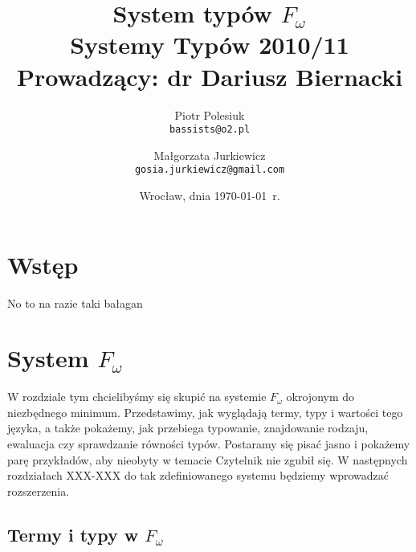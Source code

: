 \documentclass[11pt,leqno]{article}
\title{{\textbf{System typów $F_{\omega}$}}\\[1ex]
       {\Large Systemy Typów 2010/11}\\[-1ex]
       {\large Prowadzący: dr Dariusz Biernacki}}
\author{Piotr Polesiuk \\ \texttt{bassists@o2.pl} 
   \and Małgorzata Jurkiewicz \\ \texttt{gosia.jurkiewicz@gmail.com}}
\date{Wrocław, dnia \today\ r.}
\begin{document}
\thispagestyle{empty}
\maketitle

\pagebreak

\theoremstyle{plain}
\newtheorem{twierdzenie}{Twierdzenie}
\newtheorem{lemay}{Lemat}

\theoremstyle{definition}
\newtheorem{definicja}{Definicja}

\section{Wstęp}
\setcounter{equation}{0}


No to na razie taki bałagan



\section{System $F_{\omega}$}                                 
\setcounter{equation}{0}

W rozdziale tym chcielibyśmy się skupić na systemie $F_{\omega}$ okrojonym do niezbędnego minimum.
Przedstawimy, jak wyglądają termy, typy i wartości tego języka, a także pokażemy, jak przebiega typowanie,
znajdowanie rodzaju, ewaluacja czy sprawdzanie równości typów. Postaramy się pisać jasno i pokażemy parę przykładów, 
aby nieobyty w temacie Czytelnik nie zgubił się.  W następnych rozdziałach XXX-XXX do tak zdefiniowanego systemu będziemy wprowadzać
rozszerzenia.

\subsection {Termy i typy w $F_\omega$}
\end{document}
